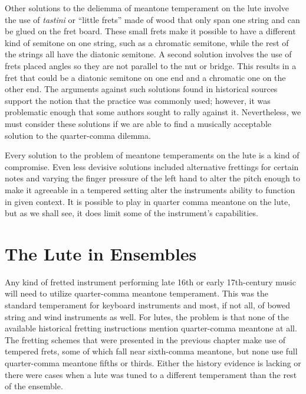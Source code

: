 Other solutions to the deliemma of meantone temperament on the lute involve the use of
\textit{tastini} or ``little frets'' made of wood that only span one string and can be
glued on the fret board.  These small frets make it possible to have a different kind of
semitone on one string, such as a chromatic semitone, while the rest of the strings all
have the diatonic semitone.  A second solution involves the use of frets placed angles so
they are not parallel to the nut or bridge.  This results in a fret that could be a
diatonic semitone on one end and a chromatic one on the other end.  The arguments against
such solutions found in historical sources support the notion that the practice was
commonly used; however, it was problematic enough that some authors sought to rally
against it. Nevertheless, we must consider these solutions if we are able to find a
musically acceptable solution to the quarter-comma dilemma.

Every solution to the problem of meantone temperaments on the lute is a kind of
compromise.  Even less devisive solutions included alternative frettings for certain notes
and varying the finger pressure of the left hand to alter the pitch enough to make it
agreeable in a tempered setting alter the instruments ability to function in given
context.  It is possible to play in quarter comma meantone on the lute, but as we shall
see, it does limit some of the instrument's capabilities.

\section{The Lute in Ensembles}

Any kind of fretted instrument performing late 16th or early 17th-century music will need
to utilize quarter-comma meantone temperament.  This was the standard temperament for
keyboard instruments and most, if not all, of bowed string and wind instruments as well.
For lutes, the problem is that none of the available historical fretting instructions
mention quarter-comma meantone at all.  The fretting schemes that were presented in the
previous chapter make use of tempered frets, some of which fall near sixth-comma meantone,
but none use full quarter-comma meantone fifths or thirds.  Either the history evidence is
lacking or there were cases when a lute was tuned to a different temperament than the rest
of the ensemble.


